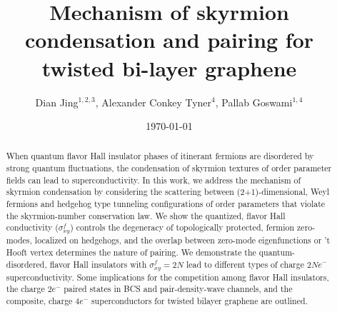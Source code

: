 \documentclass[aps,prb,amsmath,amssymb,floatfix,twocolumn]{revtex4}
\begin{document}
\title{Mechanism of skyrmion condensation and pairing for twisted bi-layer graphene}
\author{Dian Jing$^{1,2,3}$, Alexander Conkey Tyner$^4$, Pallab Goswami$^{1,4}$}

\date{\today}

\begin{abstract}
When quantum flavor Hall insulator phases of itinerant fermions are disordered by strong quantum fluctuations, the condensation of skyrmion textures of order parameter fields can lead to superconductivity. In this work, we address the mechanism of skyrmion condensation by considering the scattering between (2+1)-dimensional, Weyl fermions and hedgehog type tunneling configurations of order parameters that violate the skyrmion-number conservation law. We show the quantized, flavor Hall conductivity ($\sigma^f_{xy}$) controls the degeneracy of topologically protected, fermion zero-modes, localized on hedgehogs, and the overlap between zero-mode eigenfunctions or 't Hooft vertex determines the nature of pairing. We demonstrate the quantum-disordered, flavor Hall insulators with $\sigma^f_{xy}= 2 N$ lead to different types of charge $2 N e^-$ superconductivity. Some implications for the competition among flavor Hall insulators, the charge $2e^-$ paired states in BCS and pair-density-wave channels, and the composite, charge $4e^-$ superconductors for twisted bilayer graphene are outlined. %
\end{abstract}

\maketitle
\end{document}
